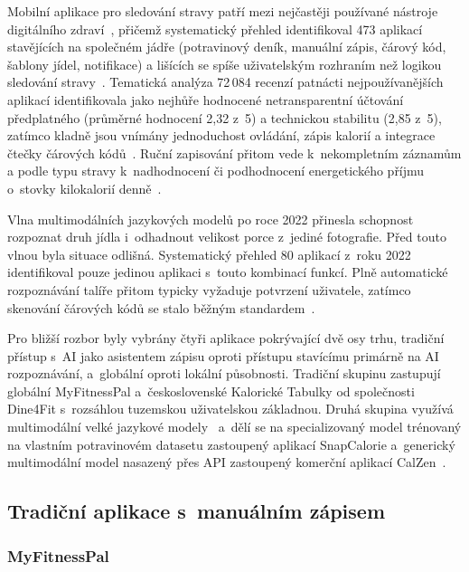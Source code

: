 Mobilní aplikace pro sledování stravy patří mezi nejčastěji používané nástroje digitálního zdraví~\cite{nogueira2024mobileApplications}, přičemž systematický přehled identifikoval 473 aplikací stavějících na společném jádře (potravinový deník, manuální zápis, čárový kód, šablony jídel, notifikace) a lišících se spíše uživatelským rozhraním než logikou sledování stravy~\cite{samad2022smartphoneApps,abeltino2025digitalApplications,gioia2023mobileApps}.
Tematická analýza 72\,084 recenzí patnácti nejpoužívanějších aplikací identifikovala jako nejhůře hodnocené netransparentní účtování předplatného (průměrné hodnocení 2,32 z~5) a technickou stabilitu (2,85 z~5), zatímco kladně jsou vnímány jednoduchost ovládání, zápis kalorií a integrace čtečky čárových kódů~\cite{zecevic2021userPerspectives}.
Ruční zapisování přitom vede k~nekompletním záznamům a podle typu stravy k~nadhodnocení či podhodnocení energetického příjmu o~stovky kilokalorií denně~\cite{li2024evaluating}.

Vlna multimodálních jazykových modelů po roce 2022 přinesla schopnost rozpoznat druh jídla i~odhadnout velikost porce z~jediné fotografie.
Před touto vlnou byla situace odlišná. Systematický přehled 80 aplikací z~roku 2022~\cite{samad2022smartphoneApps} identifikoval pouze jedinou aplikaci s~touto kombinací funkcí.
Plně automatické rozpoznávání talíře přitom typicky vyžaduje potvrzení uživatele, zatímco skenování čárových kódů se stalo běžným standardem~\cite{aburub2025foodScanning}.

Pro bližší rozbor byly vybrány čtyři aplikace pokrývající dvě osy trhu, tradiční přístup s~AI jako asistentem zápisu oproti přístupu stavícímu primárně na AI rozpoznávání, a~globální oproti lokální působnosti.
Tradiční skupinu zastupují globální MyFitnessPal a~československé Kalorické Tabulky od společnosti Dine4Fit s~rozsáhlou tuzemskou uživatelskou základnou.
Druhá skupina využívá multimodální velké jazykové modely~\cite{wang2026visionLanguageFood,fridolfsson2025llmNutrition} a~dělí se na specializovaný model trénovaný na vlastním potravinovém datasetu zastoupený aplikací SnapCalorie a~generický multimodální model nasazený přes API zastoupený komerční aplikací CalZen~\cite{coburn2025multimodalNutrition}.

\subsection{Tradiční aplikace s~manuálním zápisem}
\label{subsec:tradicniAplikace}

\subsubsection{MyFitnessPal}
\label{subsubsec:myfitnesspal}


